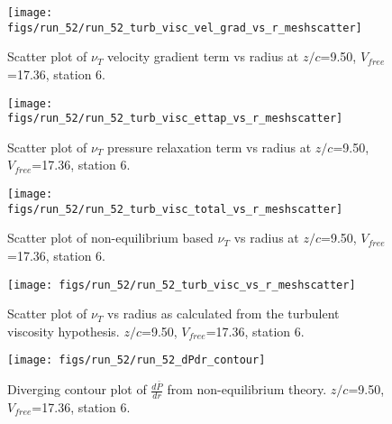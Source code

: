 \begin{figure}[H]
\centering
\texttt{[image: figs/run\_52/run\_52\_turb\_visc\_vel\_grad\_vs\_r\_meshscatter]}
\caption{Scatter plot of $\nu_T$ velocity gradient term vs radius at $z/c$=9.50, $V_{free}$=17.36, station 6.}
\end{figure}


\begin{figure}[H]
\centering
\texttt{[image: figs/run\_52/run\_52\_turb\_visc\_ettap\_vs\_r\_meshscatter]}
\caption{Scatter plot of $\nu_T$ pressure relaxation term vs radius at $z/c$=9.50, $V_{free}$=17.36, station 6.}
\end{figure}


\begin{figure}[H]
\centering
\texttt{[image: figs/run\_52/run\_52\_turb\_visc\_total\_vs\_r\_meshscatter]}
\caption{Scatter plot of non-equilibrium based $\nu_T$ vs radius at $z/c$=9.50, $V_{free}$=17.36, station 6.}
\end{figure}


\begin{figure}[H]
\centering
\texttt{[image: figs/run\_52/run\_52\_turb\_visc\_vs\_r\_meshscatter]}
\caption{Scatter plot of $\nu_T$ vs radius as calculated from the turbulent viscosity hypothesis. $z/c$=9.50, $V_{free}$=17.36, station 6.}
\end{figure}


\begin{figure}[H]
\centering
\texttt{[image: figs/run\_52/run\_52\_dPdr\_contour]}
\caption{Diverging contour plot of $\frac{d\bar{P}}{dr}$ from non-equilibrium theory. $z/c$=9.50, $V_{free}$=17.36, station 6.}
\end{figure}


